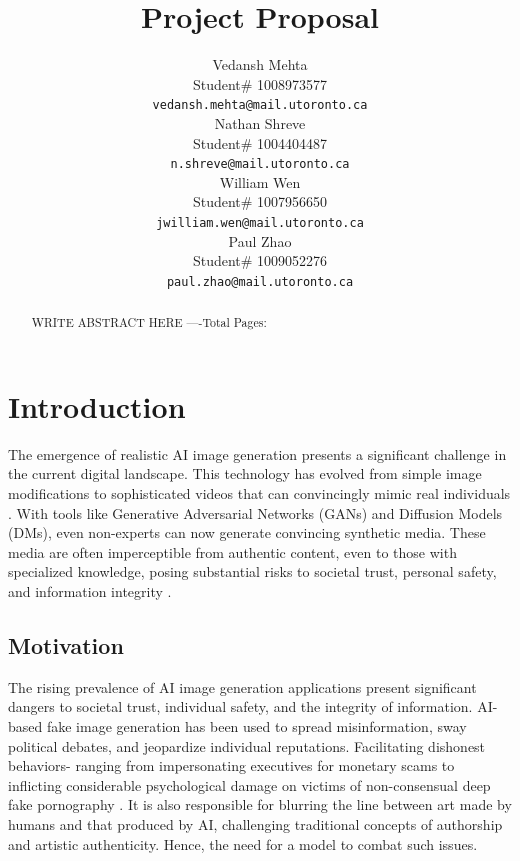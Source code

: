 \documentclass{article} %
\title{Project Proposal}
\author{Vedansh Mehta  \\
Student\# 1008973577 \\
\texttt{vedansh.mehta@mail.utoronto.ca} \\
\And
Nathan Shreve  \\
Student\# 1004404487 \\
\texttt{n.shreve@mail.utoronto.ca} \\
\AND
William Wen  \\
Student\# 1007956650 \\
\texttt{jwilliam.wen@mail.utoronto.ca} \\
\And
Paul Zhao \\
Student\# 1009052276 \\
\texttt{paul.zhao@mail.utoronto.ca} \\
\AND
}
\begin{document}
\maketitle

\begin{abstract}
WRITE ABSTRACT HERE
----Total Pages: \pageref{last_page}
\end{abstract}



\section{Introduction}
\label{intro}

The emergence of realistic AI image generation presents a significant challenge in the current digital landscape. This technology has evolved from simple image modifications to sophisticated videos that can convincingly mimic real individuals \citep{cnn2025}. With tools like Generative Adversarial Networks (GANs) and Diffusion Models (DMs), even non-experts can now generate convincing synthetic media. These media are often imperceptible from authentic content, even to those with specialized knowledge, posing substantial risks to societal trust, personal safety, and information integrity \citep{epstein2023generative}.


\subsection{Motivation}
The rising prevalence of AI image generation applications present significant dangers to societal trust, individual safety, and the integrity of information. AI-based fake image generation has been used to spread misinformation, sway political debates, and jeopardize individual reputations\citep{chesney2019}. Facilitating dishonest behaviors- ranging from impersonating executives for monetary scams to inflicting considerable psychological damage on victims of non-consensual deep fake pornography \citep{TheGuardian2023}. It is also responsible for blurring the line between art made by humans and that produced by AI, challenging traditional concepts of authorship and artistic authenticity\citep{Dipascalido2023}. Hence, the need for a model to combat such issues.
\end{document}
